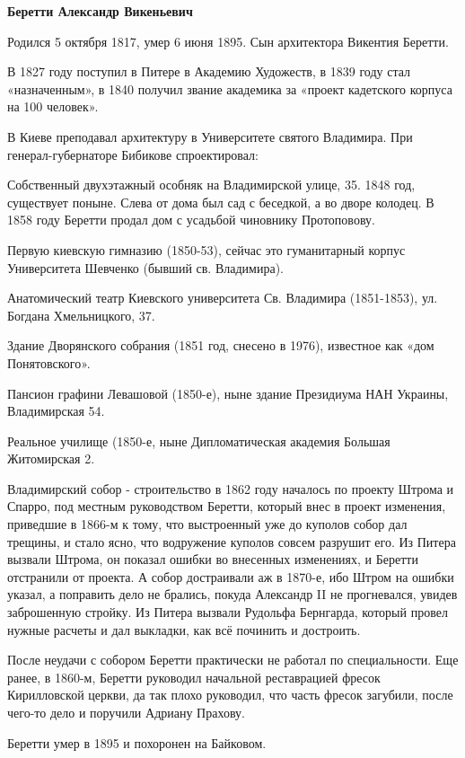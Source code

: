 \medskip


\textbf{Беретти Александр Викеньевич}

Родился 5 октября 1817, умер 6 июня 1895. Сын архитектора Викентия Беретти.

В 1827 году поступил в Питере в Академию Художеств, в 1839 году стал «назначенным», в 1840 получил звание академика за «проект кадетского корпуса на 100 человек».

В Киеве преподавал архитектуру в Университете святого Владимира. При генерал-губернаторе Бибикове спроектировал:

Собственный двухэтажный особняк на Владимирской улице, 35. 1848 год, существует поныне. Слева от дома был сад с беседкой, а во дворе колодец. В 1858 году Беретти продал дом с усадьбой чиновнику Протоповову.

Первую киевскую гимназию (1850-53), сейчас  это гуманитарный корпус Университета Шевченко (бывший св. Владимира).

Анатомический театр Киевского университета Св. Владимира (1851-1853), ул. Богдана Хмельницкого, 37.

Здание Дворянского собрания (1851 год, снесено в 1976), известное как «дом Понятовского».

Пансион графини Левашовой (1850-е), ныне здание Президиума НАН Украины, Владимирская 54.

Реальное училище (1850-е, ныне Дипломатическая академия Большая Житомирская 2.

Владимирский собор - строительство в 1862 году началось по проекту Штрома и Спарро, под местным руководством Беретти, который внес в проект изменения, приведшие в 1866-м к тому, что выстроенный уже до куполов собор дал трещины, и стало ясно, что водружение куполов совсем разрушит его. Из Питера вызвали Штрома, он показал ошибки во внесенных изменениях, и Беретти отстранили от проекта. А собор достраивали аж в 1870-е, ибо Штром на ошибки указал, а поправить дело не брались, покуда Александр II не прогневался, увидев заброшенную стройку. Из Питера вызвали Рудольфа Бернгарда, который провел нужные расчеты и дал выкладки, как всё починить и достроить. 

После неудачи с собором Беретти практически не работал по специальности. Еще ранее, в 1860-м, Беретти руководил начальной реставрацией фресок Кирилловской церкви, да так плохо руководил, что часть фресок загубили, после чего-то дело и поручили Адриану Прахову.

Беретти умер в 1895 и похоронен на Байковом.\\


